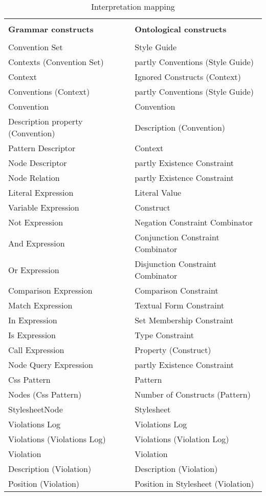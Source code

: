 \begin{table}[t]
\begin{center}
\begin{longtable}{ | p{20em} | p{20em} | } 
\hline
 &  \\
\textbf{Grammar constructs} & \textbf{Ontological constructs}  \\
 &  \\
\hline

Convention Set & Style Guide \\ \hline
Contexts (Convention Set) & partly Conventions (Style Guide) \\ \hline
Context & Ignored Constructs (Context) \\ \hline
Conventions (Context) & partly Conventions (Style Guide) \\ \hline
Convention & Convention \\ \hline
Description property (Convention) & Description (Convention) \\ \hline
Pattern Descriptor & Context \\ \hline
Node Descriptor & partly Existence Constraint \\ \hline
Node Relation & partly Existence Constraint \\ \hline

Literal Expression & Literal Value \\ \hline
Variable Expression & Construct \\ \hline
Not Expression & Negation Constraint Combinator \\ \hline
And Expression & Conjunction Constraint Combinator \\ \hline
Or Expression & Disjunction Constraint Combinator \\ \hline
Comparison Expression & Comparison Constraint \\ \hline
Match Expression & Textual Form Constraint \\ \hline
In Expression & Set Membership Constraint \\ \hline
Is Expression & Type Constraint \\ \hline
Call Expression & Property (Construct) \\ \hline
Node Query Expression & partly Existence Constraint \\ \hline

Css Pattern & Pattern \\ \hline
Nodes (Css Pattern) & Number of Constructs (Pattern) \\ \hline
StylesheetNode & Stylesheet \\ \hline
Violations Log & Violations Log \\ \hline
Violations (Violations Log) & Violations (Violation Log) \\ \hline
Violation & Violation \\ \hline
Description (Violation) & Description (Violation) \\ \hline
Position (Violation) & Position in Stylesheet (Violation) \\ \hline
\end{longtable}
\end{center}
\caption{
	\label{tab:interpretation}
	Interpretation mapping}
\end{table}